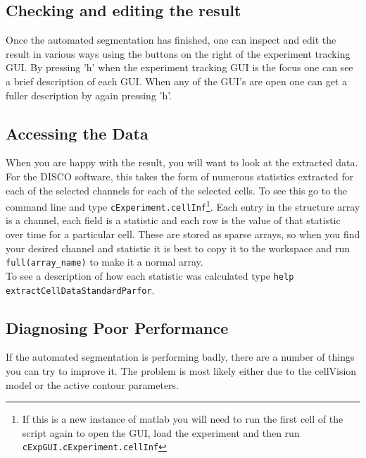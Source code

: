 \subsection{Checking and editing the result}
Once the automated segmentation has finished, one can inspect and edit the result in various ways using the buttons on the right of the experiment tracking GUI. By pressing 'h' when the experiment tracking GUI is the focus one can see a brief description of each GUI. When any of the GUI's are open one can get a fuller description by again pressing 'h'. 

\subsection{Accessing the Data}
When you are happy with the result, you will want to look at the extracted data. For the DISCO software, this takes the form of numerous statistics extracted for each of the selected channels for each of the selected cells. To see this go to the command line and type \texttt{cExperiment.cellInf}\footnote{If this is a new instance of matlab you will need to run the first cell of the script again to open the GUI, load the experiment and then run \texttt{cExpGUI.cExperiment.cellInf}}. Each entry in the structure array is a channel, each field is a statistic and each row is the value of that statistic over time for a particular cell. These are stored as sparse arrays, so when you find your desired channel and statistic it is best to copy it to the workspace and run \texttt{full(array\_name)} to make it a normal array. \\
To see a description of how each statistic was calculated type \texttt{help extractCellDataStandardParfor}.

\subsection{Diagnosing Poor Performance}
If the automated segmentation is performing badly, there are a number of things you can try to improve it. The problem is most likely either due to the cellVision model or the active contour parameters.
